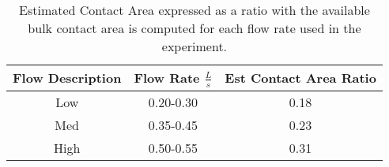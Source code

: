 \documentclass[a4paper,10pt]{scrreprt}
\begin{document}
\begin{table}[t] \label{contactT}
\centering                           
\caption{Estimated Contact Area expressed as a ratio with the available bulk contact area is computed for each flow rate used in the experiment.} 
\begin{tabular}{c c c}           
\\[1ex] 
\hline\hline             
Flow Description & Flow Rate $\frac{L}{s}$ & Est Contact Area Ratio\\
\hline
Low & 0.20-0.30 & 0.18\\
Med & 0.35-0.45 & 0.23\\
High & 0.50-0.55 & 0.31\\
\hline\hline
\end{tabular}
\label{tab:matrix}
\end{table}
\end{document}
